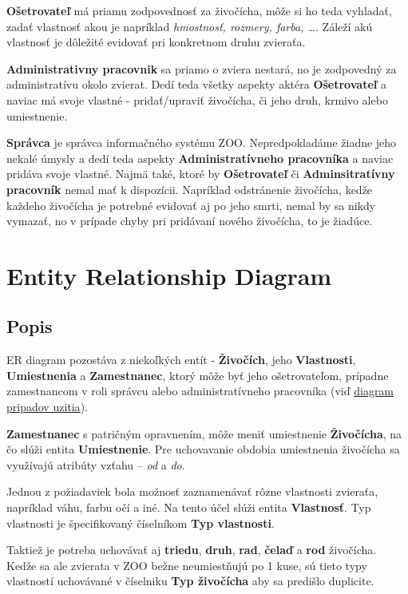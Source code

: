 \documentclass[11pt, a4paper]{article}
\begin{document}
			\textbf{Ošetrovateľ} má priamu zodpovednosť za živočícha, môže si ho teda vyhladať, zadať vlastnosť akou je napríklad \textit{hmostnosť, rozmery, farba, \dots}. Záleží akú vlastnosť je dôležité evidovať pri konkretnom druhu zvieraťa.

			\textbf{Administrativny pracovnik} sa priamo o zviera nestará, no je zodpovedný za administratívu okolo zvierat. Dedí teda všetky aspekty aktéra \textbf{Ošetrovateľ} a naviac má svoje vlastné - pridať/upraviť živočícha, či jeho druh, krmivo alebo umiestnenie.

			\textbf{Správca} je správca informačného systému ZOO. Nepredpokladáme žiadne jeho nekalé úmysly a dedí teda aspekty \textbf{Administratívneho pracovníka} a naviac pridáva svoje vlastné. Najmä také, ktoré by \textbf{Ošetrovateľ} či \textbf{Adminsitratívny pracovník} nemal mať k dispozícii. Napríklad odstránenie živočícha, kedže každeho živočícha je potrebné evidovať aj po jeho smrti, nemal by sa nikdy vymazať, no v prípade chyby pri pridávaní nového živočícha, to je žiadúce.

	    \section{Entity Relationship Diagram}
		\newpage
		\subsection{Popis}
			ER diagram pozostáva z niekoľkých entít - \textbf{Živočích}, jeho \textbf{Vlastnosti}, \textbf{Umiestnenia} a \textbf{Zamestnanec}, ktorý môže byť jeho ošetrovateľom, prípadne zamestnancom v roli správcu alebo administratívneho pracovníka (viď \hyperref[usecase]{diagram pripadov uzitia}).

			\textbf{Zamestnanec} s patričným opravnením, môže meniť umiestnenie \textbf{Živočícha}, na čo slúži entita \textbf{Umiestnenie}. Pre uchovavanie obdobia umiestnenia živočícha sa využívajú atribúty vzťahu -- \textit{od} a \textit{do}.

			Jednou z požiadaviek bola možnosť zaznamenávať rôzne vlastnosti zvieraťa, napríklad váhu, farbu očí a iné. Na tento účel slúži entita \textbf{Vlastnosť}. Typ vlastnosti je špecifikovaný číselníkom \textbf{Typ vlastnosti}.

			Taktiež je potreba uchovávať aj \textbf{triedu}, \textbf{druh}, \textbf{rad}, \textbf{čelaď} a \textbf{rod} živočícha. Kedže sa ale zvierata v ZOO bežne neumiestňujú po 1 kuse, sú tieto typy vlastností uchovávané v číselniku \textbf{Typ živočícha} aby sa predišlo duplicite.
\end{document}
